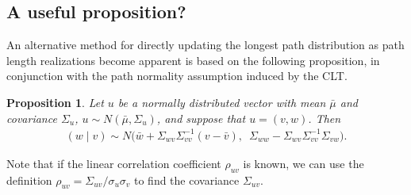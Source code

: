 \documentclass[12pt]{article}
\newtheorem{prop}[theorem]{Proposition}
\begin{document}

\subsection{A useful proposition?}
\label{subsect.updating_proposition}

An alternative method for directly updating the longest path distribution as path length realizations become apparent is based on the following proposition, in conjunction with the path normality assumption induced by the CLT.  
\begin{prop}
	Let $u$ be a normally distributed vector with mean $\bar{\mu}$ and covariance $\Sigma_u$, $u \sim N(\bar{\mu}, \Sigma_u)$, and suppose that $u = (v, w)$. Then 
	\begin{align*}
	(w \mid v) \sim N \big( \bar{w} + \Sigma_{wv}\Sigma_{vv}^{-1} (v - \bar{v}), \enspace  \Sigma_{ww} - \Sigma_{wv} \Sigma_{vv}^{-1} \Sigma_{vw} \big).
	\end{align*}
\end{prop}
Note that if the linear correlation coefficient $\rho_{uv}$ is known, we can use the definition $\rho_{uv} = \Sigma_{uv} / \sigma_u \sigma_v$ to find the covariance $\Sigma_{uv}$.
\end{document}
